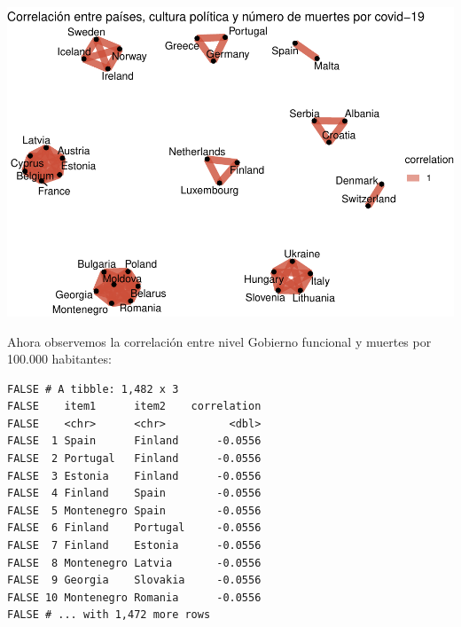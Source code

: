 \documentclass[
]{article}
\newenvironment{Shaded}{\begin{snugshade}}{\end{snugshade}}
\newcommand{\DataTypeTok}[1]{\textcolor[rgb]{0.13,0.29,0.53}{#1}}
\newcommand{\KeywordTok}[1]{\textcolor[rgb]{0.13,0.29,0.53}{\textbf{#1}}}
\newcommand{\NormalTok}[1]{#1}
\newcommand{\OperatorTok}[1]{\textcolor[rgb]{0.81,0.36,0.00}{\textbf{#1}}}
\newcommand{\StringTok}[1]{\textcolor[rgb]{0.31,0.60,0.02}{#1}}
\begin{document}
\includegraphics{2020-05-15-corrupcion-y-covid-19_files/figure-latex/unnamed-chunk-10-1.pdf}

Ahora observemos la correlación entre nivel Gobierno funcional y muertes
por 100.000 habitantes:

\begin{Shaded}
\end{Shaded}

\begin{verbatim}
FALSE # A tibble: 1,482 x 3
FALSE    item1      item2    correlation
FALSE    <chr>      <chr>          <dbl>
FALSE  1 Spain      Finland      -0.0556
FALSE  2 Portugal   Finland      -0.0556
FALSE  3 Estonia    Finland      -0.0556
FALSE  4 Finland    Spain        -0.0556
FALSE  5 Montenegro Spain        -0.0556
FALSE  6 Finland    Portugal     -0.0556
FALSE  7 Finland    Estonia      -0.0556
FALSE  8 Montenegro Latvia       -0.0556
FALSE  9 Georgia    Slovakia     -0.0556
FALSE 10 Montenegro Romania      -0.0556
FALSE # ... with 1,472 more rows
\end{verbatim}
\end{document}
